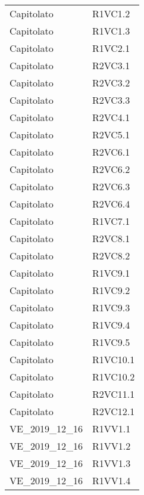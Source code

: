 {\begin{longtable}{ C{4cm} C{4cm}}
Capitolato & R1VC1.2\\

Capitolato & R1VC1.3\\

Capitolato & R1VC2.1\\

Capitolato & R2VC3.1\\

Capitolato & R2VC3.2\\

Capitolato & R2VC3.3\\

Capitolato & R2VC4.1\\

Capitolato & R2VC5.1\\


Capitolato & R2VC6.1\\

Capitolato & R2VC6.2\\

Capitolato & R2VC6.3\\

Capitolato & R2VC6.4\\

Capitolato & R1VC7.1\\

Capitolato & R2VC8.1\\

Capitolato & R2VC8.2\\

Capitolato & R1VC9.1\\

Capitolato & R1VC9.2\\

Capitolato & R1VC9.3\\

Capitolato & R1VC9.4\\

Capitolato & R1VC9.5\\

Capitolato & R1VC10.1\\

Capitolato & R1VC10.2\\

Capitolato & R2VC11.1\\

Capitolato & R2VC12.1\\


VE\_2019\_12\_16 & R1VV1.1\\

VE\_2019\_12\_16 & R1VV1.2\\

VE\_2019\_12\_16 & R1VV1.3\\

VE\_2019\_12\_16 & R1VV1.4\\


\end{longtable}
}